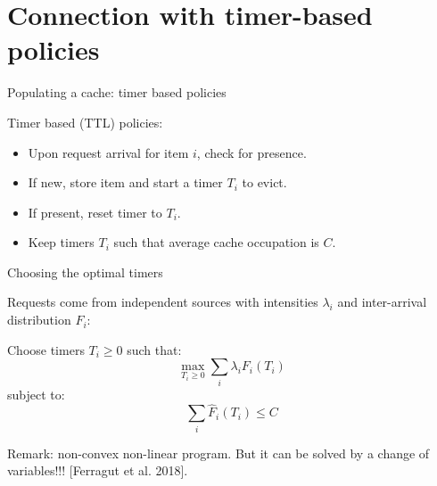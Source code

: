 \documentclass[aspectratio=169]{beamer}
\newenvironment*{myitem}[1][1.5em]{\begin{itemize}\setlength{\itemsep}{#1}}{\end{itemize}}
\begin{document}
\section{Connection with timer-based policies}

\begin{frame}{Populating a cache: timer based policies}
	
	\alert{Timer based (TTL) policies:}\vfill
	
	\begin{myitem}[1em]
		\item Upon request arrival for item $i$, check for presence.
		\item If new, store item and start a \alert{timer} $T_i$ to evict.
		\item If present, reset timer to $T_i$.
		\item Keep timers $T_i$ such that \alert{average} cache occupation is $C$.
	\end{myitem}
	
	\vspace{1.5em}
	
	\centering
	
\end{frame}

\begin{frame}{Choosing the optimal timers}

	Requests come from independent sources with intensities $\lambda_i$ and inter-arrival distribution $F_i$:

	\vfill

	\begin{problem}
		Choose timers $T_i\geqslant 0$ such that:
		\begin{equation*}
			\max_{T_i\geqslant 0} \sum_i \lambda_i F_i(T_i)
		\end{equation*}
		subject to:
		\begin{equation*}
			\sum_i \hat{F}_i(T_i) \leqslant C
		\end{equation*}
	\end{problem}

	\vfill
	\alert{Remark:} non-convex non-linear program. But it can be solved by a change of variables!!! [Ferragut et al. 2018].
\end{frame}
\end{document}
